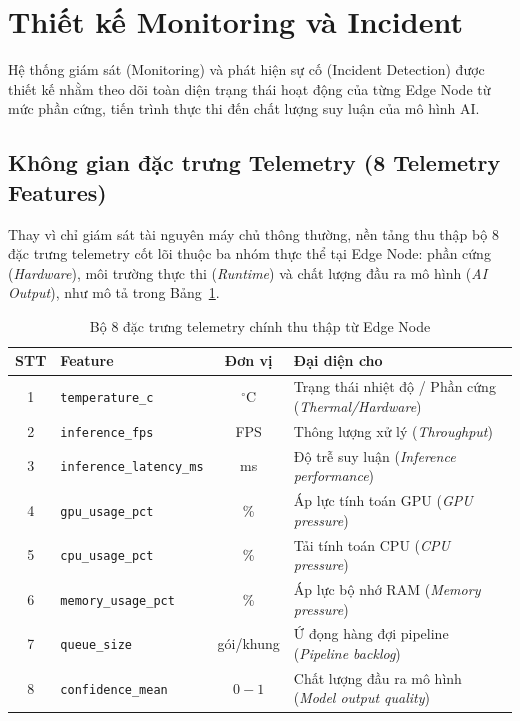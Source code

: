 \section{Thiết kế Monitoring và Incident}

Hệ thống giám sát (Monitoring) và phát hiện sự cố (Incident Detection) được thiết kế nhằm theo dõi toàn diện trạng thái hoạt động của từng Edge Node từ mức phần cứng, tiến trình thực thi đến chất lượng suy luận của mô hình AI.

\subsection{Không gian đặc trưng Telemetry (8 Telemetry Features)}

Thay vì chỉ giám sát tài nguyên máy chủ thông thường, nền tảng thu thập bộ 8 đặc trưng telemetry cốt lõi thuộc ba nhóm thực thể tại Edge Node: phần cứng (\textit{Hardware}), môi trường thực thi (\textit{Runtime}) và chất lượng đầu ra mô hình (\textit{AI Output}), như mô tả trong Bảng~\ref{tab:telemetry-features}.

\begin{table}[H]
\centering
\caption{Bộ 8 đặc trưng telemetry chính thu thập từ Edge Node}
\label{tab:telemetry-features}
\begin{tabular}{|c|l|c|l|}
\hline
\textbf{STT} & \textbf{Feature} & \textbf{Đơn vị} & \textbf{Đại diện cho} \\ \hline
1 & \texttt{temperature\_c} & $^\circ\text{C}$ & Trạng thái nhiệt độ / Phần cứng (\textit{Thermal/Hardware}) \\ \hline
2 & \texttt{inference\_fps} & FPS & Thông lượng xử lý (\textit{Throughput}) \\ \hline
3 & \texttt{inference\_latency\_ms} & ms & Độ trễ suy luận (\textit{Inference performance}) \\ \hline
4 & \texttt{gpu\_usage\_pct} & \% & Áp lực tính toán GPU (\textit{GPU pressure}) \\ \hline
5 & \texttt{cpu\_usage\_pct} & \% & Tải tính toán CPU (\textit{CPU pressure}) \\ \hline
6 & \texttt{memory\_usage\_pct} & \% & Áp lực bộ nhớ RAM (\textit{Memory pressure}) \\ \hline
7 & \texttt{queue\_size} & gói/khung & Ứ đọng hàng đợi pipeline (\textit{Pipeline backlog}) \\ \hline
8 & \texttt{confidence\_mean} & $0 - 1$ & Chất lượng đầu ra mô hình (\textit{Model output quality}) \\ \hline
\end{tabular}
\end{table}

